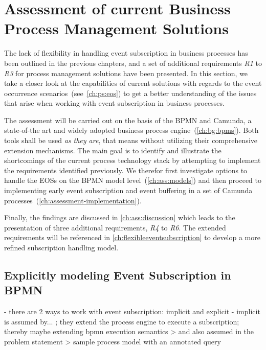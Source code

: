 \chapter{Assessment of current Business Process Management Solutions}\label{ch:assessment}

The lack of flexibility in handling event subscription in business processes has been outlined in the previous chapters, and a set of additional requirements \textit{R1} to \textit{R3} for process management solutions have been presented.
In this section, we take a closer look at the capabilities of current solutions with regards to the event occurrence scenarios~(see~\autoref{ch:ps:eos}) to get a better understanding of the issues that arise when working with event subscription in business processes.

The assessment will be carried out on the basis of the \ac{BPMN} and Camunda, a state-of-the art and widely adopted business process engine~(\autoref{ch:bg:bpms}). Both tools shall be used \textit{as they are}, that means without utilizing their comprehensive extension mechanisms.
The main goal is to identify and illustrate the shortcomings of the current process technology stack by attempting to implement the requirements identified previously.
We therefor first investigate options to handle the \acs{EOS}s on the BPMN model level~(\autoref{ch:ass:models}) and then proceed to implementing early event subscription and event buffering in a set of Camunda processes~(\autoref{ch:assessment-implementation}).

Finally, the findings are discussed in \autoref{ch:ass:discussion} which leads to the presentation of three additional requirements, \textit{R4} to \textit{R6}.
The extended requirements will be referenced in \autoref{ch:flexibleeventsubscription} to develop a more refined subscription handling model.


\section{Explicitly modeling Event Subscription in BPMN}

- there are 2 ways to work with event subscription: implicit and explicit
- implicit is assumed by... ; they extend the process engine to execute a subscription; thereby maybe extending bpmn execution semantics
	> and also assumed in the problem statement
	> sample process model with an annotated query
	
